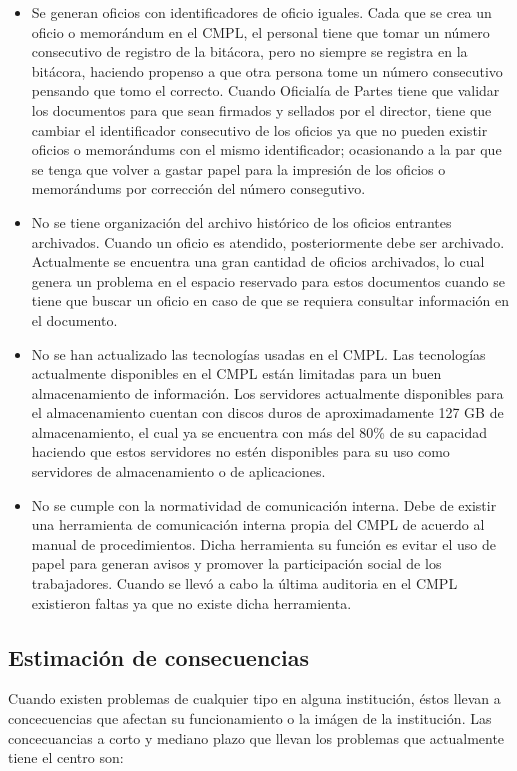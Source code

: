 \begin{itemize}
	\item Se generan oficios con identificadores de oficio iguales.	
Cada que se crea un oficio o memorándum en el CMPL, el personal tiene que tomar un número consecutivo de registro de la bitácora, pero no siempre se registra en la bitácora, haciendo propenso a que otra persona tome un número consecutivo pensando que tomo el correcto. Cuando Oficialía de Partes tiene que validar los documentos para que sean firmados y sellados por el director, tiene que cambiar el identificador consecutivo de los oficios ya que no pueden existir oficios o memorándums con el mismo identificador; ocasionando a la par	que se tenga que volver a gastar papel para la impresión de los oficios o memorándums por corrección del número consegutivo.

	\item No se tiene organización del archivo histórico de los oficios entrantes archivados.
Cuando un oficio es atendido, posteriormente debe ser archivado. Actualmente se encuentra una gran cantidad de oficios archivados, lo cual genera un problema en el espacio reservado para estos documentos cuando se tiene que buscar un oficio en caso de que se requiera consultar información en el documento.
	
	\item No se han actualizado las tecnologías usadas en el CMPL.
Las tecnologías actualmente disponibles en el CMPL están limitadas para un buen almacenamiento de información. Los servidores actualmente disponibles  para el almacenamiento cuentan con discos duros de aproximadamente 127 GB de almacenamiento, el cual ya se encuentra con más del 80\% de su capacidad haciendo que estos servidores no estén disponibles para su uso como servidores de almacenamiento o de aplicaciones.

	\item No se cumple con la normatividad de comunicación interna.
Debe de existir una herramienta de comunicación interna propia del CMPL de acuerdo al manual de procedimientos. Dicha herramienta su función es evitar el uso de papel para generan avisos y promover la participación social de los trabajadores. Cuando se llevó a cabo la última auditoria en el CMPL existieron faltas ya que no existe dicha herramienta.
	
\end{itemize}
	\subsection{Estimación de consecuencias}
	Cuando existen problemas de cualquier tipo en alguna institución, éstos llevan a concecuencias que afectan su funcionamiento o la imágen de la institución. Las concecuancias a corto y mediano plazo que llevan los problemas que actualmente tiene el centro son:

